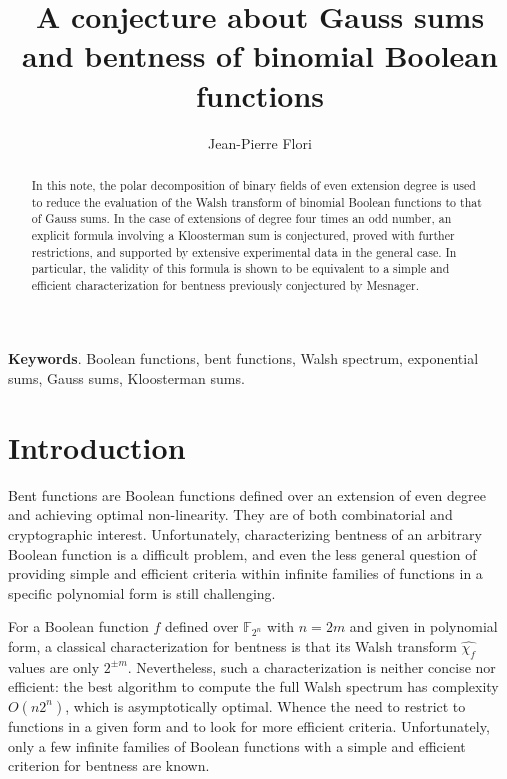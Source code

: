 \documentclass{llncs}
\title{A conjecture about Gauss sums and bentness of binomial Boolean functions}
\author{Jean-Pierre Flori}%
\institute{Agence nationale de la sécurité des systèmes d'information\\
51, boulevard de La Tour-Maubourg,\\
75700 Paris 07 SP, France.\\
\email{jean-pierre.flori@ssi.gouv.fr}
}
\date{}
\newcommand{\GF}[2][2]{\mathbb{F}_{#1^{#2}}}
\newcommand{\Wa}[1]{\widehat{\chi_{#1}}}
\begin{document}
\maketitle

\begin{abstract}
  In this note, the polar decomposition of binary fields of even extension degree is
  used to reduce the evaluation of the Walsh transform of binomial Boolean functions
  to that of Gauss sums.
  In the case of extensions of degree four times an odd number, an explicit formula involving a Kloosterman sum is conjectured,
  proved with further restrictions, and supported by extensive experimental
  data in the general case.
  In particular, the validity of this formula is shown to be equivalent
  to a simple and efficient characterization for bentness
  previously conjectured by Mesnager.
\end{abstract}

\noindent
{\bf Keywords}. Boolean functions, bent functions, Walsh spectrum, exponential sums, Gauss sums, Kloosterman sums.


\section{Introduction}
\label{sec:introduction}

Bent functions are Boolean functions defined over an extension of even
degree and achieving optimal non-linearity.
They are of both combinatorial and cryptographic interest.
Unfortunately, characterizing bentness of an arbitrary Boolean function
is a difficult problem,
and even the less general question of providing simple and efficient
criteria within infinite families of functions in a specific polynomial form
is still challenging.

For a Boolean function $f$ defined over $\GF{n}$ with $n = 2 m$ and
given in polynomial form, a classical characterization for bentness
is that its Walsh transform $\Wa{f}$ values are only $2^{\pm m}$.
Nevertheless, such a characterization is neither concise nor efficient:
the best algorithm to compute the full Walsh spectrum has complexity $O(n 2^n)$,
which is asymptotically optimal.
Whence the need to restrict to functions
in a given form and to look for more efficient criteria.
Unfortunately, only a few infinite families of Boolean functions
with a simple and efficient criterion for bentness are known.
\end{document}
